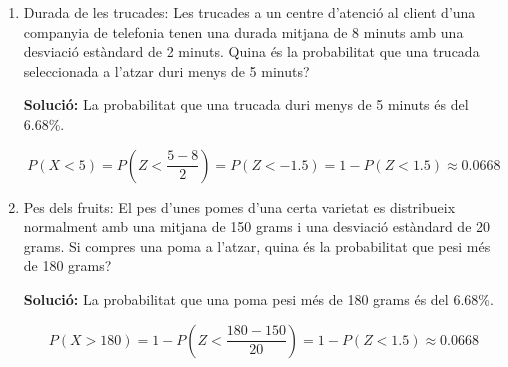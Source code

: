 \documentclass[12pt]{article}
\begin{document}
\begin{exemple} [title=]
\begin{enumerate} [start=23]
    \textbf{Solució:} La probabilitat que un cotxe tingui un consum entre 13 km/l i 18 km/l és del 77.45\%.
    
    \begin{align*}
    P(13 < X < 18) &= P\left(Z< \frac{18 - 15}{2} \right) - P\left(Z< \frac{13 - 15}{2} \right) \\
    &= P(Z< 1.5) - P(Z< -1) \approx 0.7745 
    \end{align*}


    \item Durada de les trucades: Les trucades a un centre d'atenció al client d'una companyia de telefonia tenen una durada mitjana de 8 minuts amb una desviació estàndard de 2 minuts. Quina és la probabilitat que una trucada seleccionada a l'atzar duri menys de 5 minuts?
    
    \textbf{Solució:} La probabilitat que una trucada duri menys de 5 minuts és del 6.68\%.
    
    \[
    P(X < 5) = P\left(Z< \frac{5 - 8}{2} \right) = P(Z< -1.5) = 1 - P(Z< 1.5) \approx 0.0668
    \]

    \item Pes dels fruits: El pes d'unes pomes d'una certa varietat es distribueix normalment amb una mitjana de 150 grams i una desviació estàndard de 20 grams. Si compres una poma a l'atzar, quina és la probabilitat que pesi més de 180 grams?
    
    \textbf{Solució:} La probabilitat que una poma pesi més de 180 grams és del 6.68\%.
    
    \[
    P(X > 180) = 1 - P\left(Z< \frac{180 - 150}{20} \right) = 1 - P(Z< 1.5) \approx 0.0668
    \]
\end{enumerate}
\end{exemple}
\end{document}
